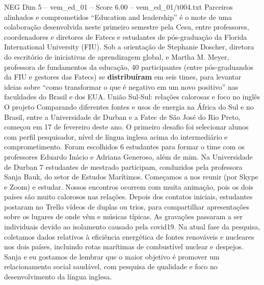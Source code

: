 \begin{textsample}{NEG Dim 5 – vem\_ed\_01 – Score 6.00 – vem\_ed\_01/t004.txt}  \label{ex:f5_neg_055}
Parceiros alinhados e comprometidos “Education and leadership” é o mote de uma colaboração desenvolvida neste primeiro semestre pela Cesu, entre professores, coordenadores e diretores de Fatecs e estudantes de pós-graduação da Florida International University (FIU).
Sob a orientação de Stephanie Doscher, diretora do escritório de iniciativas de aprendizagem global, e Martha M.
Meyer, professora de fundamentos da educação, 40 participantes (entre pós-graduandos da FIU e gestores das Fatecs) se \textbf{distribuíram} em seis times, para levantar ideias sobre “como transformar o que é negativo em um novo positivo” nas faculdades do Brasil e dos EUA.
União Sul-Sul: relações calorosas e foco no inglês O projeto Comparando diferentes fontes e usos de energia na África do Sul e no Brasil, entre a Universidade de Durban e a Fatec de São José do Rio Preto, começou em 17 de fevereiro deste ano.
O primeiro desafio foi selecionar alunos com perfil pesquisador, nível de língua inglesa acima do intermediário e comprometimento.
Foram escolhidos 6 estudantes para formar o time com os professores Eduardo Inácio e Adriana Generoso, além de mim.
Na Universidade de Durban 7 estudantes de mestrado participam, conduzidos pela professora Sanja Bauk, do setor de Estudos Marítimos.
Começamos a nos reunir (por Skype e Zoom) e estudar.
Nossos encontros ocorrem com muita animação, pois os dois países são muito calorosos nas relações.
Depois dos contatos iniciais, estudantes postaram no Trello vídeos de duplas ou trios, para compartilhar apresentações sobre os lugares de onde vêm e músicas típicas.
As gravações passaram a ser individuais devido ao isolamento causado pela covid19.
Na atual fase da pesquisa, coletamos dados relativos à eficiência energética de fontes renováveis e nucleares nos dois países, incluindo rotas marítimas de combustível nuclear e despejos.
Sanja e eu gostamos de lembrar que o maior objetivo é promover um relacionamento social saudável, com pesquisa de qualidade e foco no desenvolvimento da língua inglesa.

\end{textsample}
